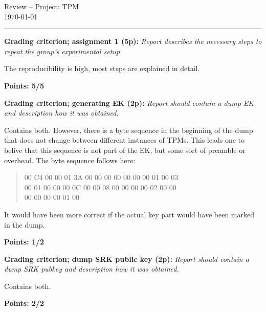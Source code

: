 \documentclass{article}
\newcommand{\grade}[5]{
  \textbf{Grading criterion; #1 (#3p):}\textit{#4}

  #5
  \hfill
  \begin{varwidth}{\linewidth}
    \textbf{Points: #2/#3}
  \end{varwidth}
}
\begin{document}
  \begin{center}
    \huge{Review -- Project: TPM} \\
    \vspace{0.2cm}
    \Large{\today}
    \vspace{0.4cm}
    \hrule
  \end{center}

  \grade{assignment 1}{5}{5}
  {
    Report describes the necessary steps to repeat the group's
    experimental setup.
  }
  {
    The reproducibility is high, most steps are explained in detail.
  }

  \grade{generating EK}{1}{2}
  {
    Report should contain a dump EK and description how it was obtained.
  }
  {
    Contains both. However, there is a byte sequence in the beginning of the dump that does not change between different instances of TPMs. This leads one to belive that this sequence is not part of the EK, but some sort of preamble or overhead. 
The byte sequence follows here: 
\begin{quote}
00 C4 00 00 01 3A 00 00 00 00 00 00 00 01 00 03 \\
00 01 00 00 00 0C 00 00 08 00 00 00 00 02 00 00 \\
00 00 00 00 01 00
\end{quote}

It would have been more correct if the actual key part would have been marked in the dump.
  }

  \grade{dump SRK public key}{2}{2}
  {
    Report should contain a dump SRK pubkey and description how it was
    obtained.
  }
  {
    Contains both.
  }
\end{document}
